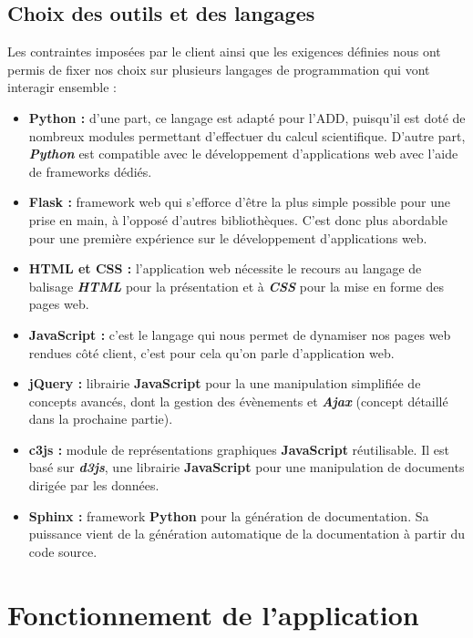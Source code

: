 		\subsection{Choix des outils et des langages}
		Les contraintes imposées par le client ainsi que les exigences définies nous ont permis de fixer nos choix sur plusieurs langages de programmation qui vont interagir ensemble : 
		\begin{itemize}[leftmargin=*]
			\item \textbf{Python :} d'une part, ce langage est adapté pour l'ADD, puisqu'il est doté de nombreux modules permettant d'effectuer du calcul scientifique. D'autre part, \textbf{\textit{Python}} est compatible avec le développement d’applications web avec l'aide de frameworks dédiés.
			\item \textbf{Flask :} framework web qui s’efforce d’être la plus simple possible pour une prise en main, à l'opposé d'autres bibliothèques. C'est donc plus abordable pour une première expérience sur le développement d'applications web.
			\item \textbf{HTML et CSS :} l'application web nécessite le recours au langage de balisage \textbf{\textit{HTML}} pour la présentation et à \textbf{\textit{CSS}} pour la mise en forme des pages web.
			\item \textbf{JavaScript :} c'est le langage qui nous permet de dynamiser nos pages web rendues côté client, c'est pour cela qu'on parle d'application web.
			\item \textbf{jQuery :} librairie \textbf{JavaScript} pour la une manipulation simplifiée de concepts avancés, dont la gestion des évènements et \textbf{\textit{Ajax}} (concept détaillé dans la prochaine partie).
			\item \textbf{c3js :} module de représentations graphiques \textbf{JavaScript} réutilisable. Il est basé sur \textbf{\textit{d3js}}, une librairie \textbf{JavaScript} pour une manipulation de documents dirigée par les données.
			\item \textbf{Sphinx :} framework \textbf{Python} pour la génération de documentation. Sa puissance vient de la génération automatique de la documentation à partir du code source.
		\end{itemize}
		
			
	\section{Fonctionnement de l'application}

